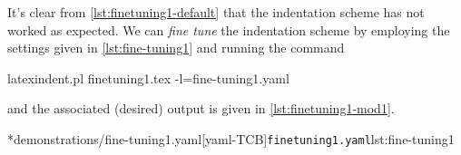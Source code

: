 It's clear from \cref{lst:finetuning1-default} that the indentation scheme has not worked as expected. We can \emph{fine tune} the 
indentation scheme by employing the settings given in \cref{lst:fine-tuning1} and running the command
\begin{commandshell}
latexindent.pl finetuning1.tex -l=fine-tuning1.yaml
\end{commandshell}
and the associated (desired) output is given in \cref{lst:finetuning1-mod1}.

        \begin{cmhtcbraster}[raster column skip=.01\linewidth]
		\cmhlistingsfromfile*[style=yaml-LST]*{demonstrations/fine-tuning1.yaml}[yaml-TCB]{\texttt{finetuning1.yaml}}{lst:fine-tuning1}
        \end{cmhtcbraster}
